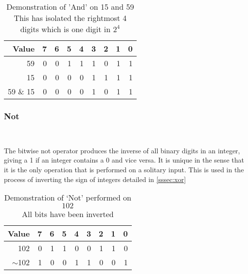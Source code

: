 \documentclass[12pt]{article}
\begin{document}
\begin{table}[htpb]
	\centering
	\begin{tabular}{r|rrrrrrrr}
		\hline
		 Value   &   7 &   6 &   5 &   4 &   3 &   2 &   1 &   0 \\
		\hline
		 59      &   0 &   0 &   1 &   1 &   1 &   0 &   1 &   1 \\
		 15      &   0 &   0 &   0 &   0 &   1 &   1 &   1 &   1 \\
		 \hline
		 59 \& 15 &   0 &   0 &   0 &   0 &   1 &   0 &   1 &   1 \\
		\hline
		\end{tabular}

	\caption{Demonstration of 'And' on 15 and 59 \\ This has isolated the rightmost 4 digits which is one digit in $2^{4}$}
\end{table}
\subsubsection{Not}\
\label{sssec:not}
\par
The bitwise not operator produces the inverse of all binary digits in an integer, giving a 1 if an integer contains a 0 and vice versa. It is unique in the sense that it is the only operation that is performed on a solitary input. This is used in the process of inverting the sign of integers detailed in \ref{sssec:xor}


\begin{table}[htpb]
	\centering
	\begin{tabular}{r|rrrrrrrr}
		\hline
		 Value   &   7 &   6 &   5 &   4 &   3 &   2 &   1 &   0 \\
		\hline
		 102     &   0 &   1 &   1 &   0 &   0 &   1 &   1 &   0 \\
		 $\sim$102    &   1 &   0 &   0 &   1 &   1 &   0 &   0 &   1 \\
		\hline
		\end{tabular}
	\caption{Demonstration of `Not' performed on $102$ \\ All bits have been inverted}
\end{table}
\pagebreak
\end{document}
